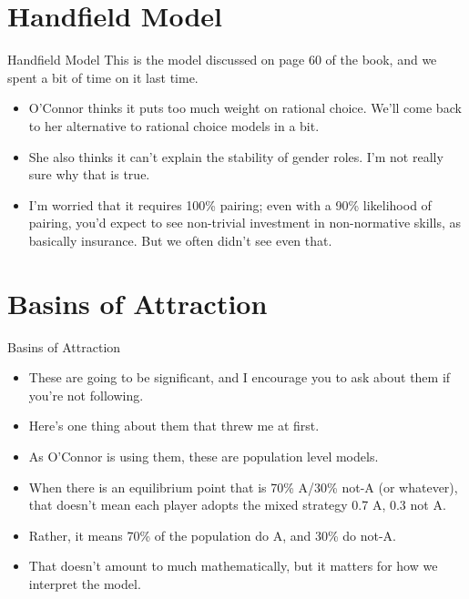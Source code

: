\documentclass[
  ignorenonframetext,
]{beamer}
\providecommand{\tightlist}{%
  \setlength{\itemsep}{0pt}\setlength{\parskip}{0pt}}
\begin{document}
\hypertarget{handfield-model}{%
\section{Handfield Model}\label{handfield-model}}

\begin{frame}{Handfield Model}
\protect\hypertarget{handfield-model-1}{}
This is the model discussed on page 60 of the book, and we spent a bit
of time on it last time.

\begin{itemize}[<+->]
\tightlist
\item
  O'Connor thinks it puts too much weight on rational choice. We'll come
  back to her alternative to rational choice models in a bit.
\item
  She also thinks it can't explain the stability of gender roles. I'm
  not really sure why that is true.
\item
  I'm worried that it requires 100\% pairing; even with a 90\%
  likelihood of pairing, you'd expect to see non-trivial investment in
  non-normative skills, as basically insurance. But we often didn't see
  even that.
\end{itemize}
\end{frame}

\hypertarget{basins-of-attraction}{%
\section{Basins of Attraction}\label{basins-of-attraction}}

\begin{frame}{Basins of Attraction}
\protect\hypertarget{basins-of-attraction-1}{}
\begin{itemize}
\tightlist
\item
  These are going to be significant, and I encourage you to ask about
  them if you're not following.
\item
  Here's one thing about them that threw me at first.
\item
  As O'Connor is using them, these are population level models.
\item
  When there is an equilibrium point that is 70\% A/30\% not-A (or
  whatever), that doesn't mean each player adopts the mixed strategy 0.7
  A, 0.3 not A.
\item
  Rather, it means 70\% of the population do A, and 30\% do not-A.
\item
  That doesn't amount to much mathematically, but it matters for how we
  interpret the model.
\end{itemize}
\end{frame}
\end{document}
